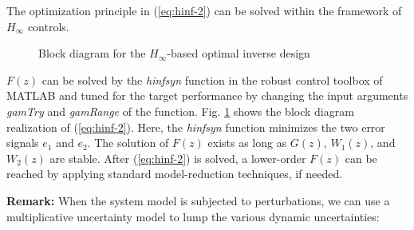 \documentclass [11pt, proquest] {uwthesis}[2020/02/24]
\begin{document}
The optimization principle in (\ref{eq:hinf-2}) can be solved within
the framework of $H_{\infty}$ controls. 
\begin{figure}
\begin{centering}
\par\end{centering}
\caption{\label{fig:Block-diagram-for}Block diagram for the $H_{\infty}$-based
optimal inverse design}
\end{figure}
$F(z)$ can be solved by the \emph{hinfsyn} function in the robust
control toolbox of MATLAB and tuned for the target performance by
changing the input arguments\emph{ gamTry} and \emph{gamRange} of
the function. Fig. \ref{fig:Block-diagram-for} shows the block diagram
realization of (\ref{eq:hinf-2}). Here, the \emph{hinfsyn} function
minimizes the two error signals $e_{1}$ and $e_{2}$. The solution
of $F(z)$ exists as long as $G(z)$, $W_{1}(z)$, and $W_{2}(z)$
are stable. After (\ref{eq:hinf-2}) is solved, a lower-order $F(z)$
can be reached by applying standard model-reduction techniques, if
needed.

\textbf{Remark: }When the system model is subjected to perturbations,
we can use a multiplicative uncertainty model to lump the various
dynamic uncertainties:
\end{document}
